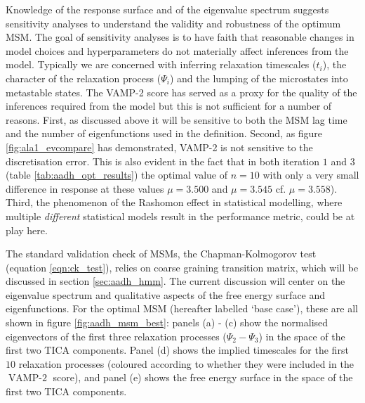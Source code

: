 Knowledge of the response surface and of the eigenvalue spectrum suggests sensitivity analyses to understand the validity and robustness of the optimum MSM.  The goal of sensitivity analyses is to have faith that reasonable changes in model choices and hyperparameters do not materially affect inferences from the model. Typically we are concerned with inferring relaxation timescales ($t_{i}$), the character of the relaxation process ($\Psi_{i}$) and the lumping of the microstates into metastable states. The VAMP-2 score has served as a proxy for the quality of the inferences required from the model but this is not sufficient  for a number of reasons.  First, as discussed above it will be sensitive to both the MSM lag time and the number of eigenfunctions used in the definition. Second, as figure \ref{fig:ala1_evcompare} has demonstrated, VAMP-2 is not sensitive to the discretisation error. This is also evident in the fact that in both iteration $1$ and $3$ (table \ref{tab:aadh_opt_results}) the optimal value of $n=10$ with only a very small difference in response at these values $\mu = 3.500$ and   $\mu=3.545$ cf. $\mu=3.558$). Third, the phenomenon of the Rashomon effect \cite{breiman2001} in statistical modelling, where  multiple \emph{different} statistical models result in the performance metric, could be at play here.

The standard validation check of MSMs, the Chapman-Kolmogorov test (equation \ref{eqn:ck_test}), relies on coarse graining transition matrix, which will be discussed in section \ref{sec:aadh_hmm}. The current discussion will center on the eigenvalue spectrum and qualitative aspects of the free energy surface and eigenfunctions. For the optimal MSM (hereafter labelled `base case'), these are all shown in figure \ref{fig:aadh_msm_best}: panels (a) - (c) show the normalised eigenvectors of the first three relaxation processes ($\Psi_{2} - \Psi_{3}$) in the space of the first two TICA components. Panel (d) shows the implied timescales for the first $10$ relaxation processes (coloured according to whether they were included in the $\operatorname{VAMP-2}$ score), and panel (e) shows the free energy surface in the space of the first two TICA components. 

